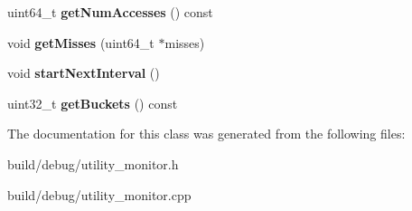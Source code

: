 \begin{DoxyCompactItemize}
\item 
\hypertarget{classUMon_a0f90608dbef871ecc9ebeda383ab276f}{uint64\-\_\-t {\bfseries get\-Num\-Accesses} () const }\label{classUMon_a0f90608dbef871ecc9ebeda383ab276f}

\item 
\hypertarget{classUMon_a3692df466d03a027aeeb6d8b4d21d53c}{void {\bfseries get\-Misses} (uint64\-\_\-t $\ast$misses)}\label{classUMon_a3692df466d03a027aeeb6d8b4d21d53c}

\item 
\hypertarget{classUMon_ac01d1d8753cf7cebbe4b35648faa4c3c}{void {\bfseries start\-Next\-Interval} ()}\label{classUMon_ac01d1d8753cf7cebbe4b35648faa4c3c}

\item 
\hypertarget{classUMon_a9836e828ed4cd975429234b881592876}{uint32\-\_\-t {\bfseries get\-Buckets} () const }\label{classUMon_a9836e828ed4cd975429234b881592876}

\end{DoxyCompactItemize}


The documentation for this class was generated from the following files\-:\begin{DoxyCompactItemize}
\item 
build/debug/utility\-\_\-monitor.\-h\item 
build/debug/utility\-\_\-monitor.\-cpp\end{DoxyCompactItemize}
